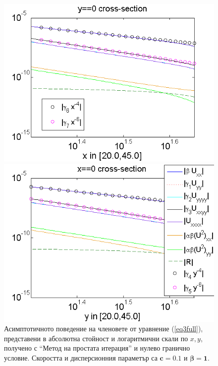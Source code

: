\documentclass[a4paper]{article}
\newcommand{\rf}[1]{(\ref{#1})}
\theoremstyle{remark}
\begin{document}
\FloatBarrier
\begin{figure}[ht]
	\begin{minipage}[b]{0.95\linewidth}
		\raggedleft
		\includegraphics[width=\linewidth]{AssymptForEachTerm/bt1_c010_090/ChristovIC_AlongX_50_ZB2_bt1_c010_h020_O(h^6).png}
	\end{minipage}
	\begin{minipage}[b]{0.95\linewidth}
		 \raggedright
		\includegraphics[width=\linewidth]{AssymptForEachTerm/bt1_c010_090/ChristovIC_AlongY_50_ZB2_bt1_c010_h020_O(h^6).png}
	\end{minipage}
	\caption{Асимптотичното поведение на членовете от уравнение \rf{eq3full}, представени в абсолютна стойност и логаритмични скали по $x,y$, получено с ``Метод на простата итерация'' и нулево гранично условие. Скоростта и дисперсионния параметър са $\boldsymbol{c=0.1}$ и $\boldsymbol{\beta = 1}$. }
	\label{fig:assympt_beta1c01}
\end{figure}
\FloatBarrier
\end{document}
